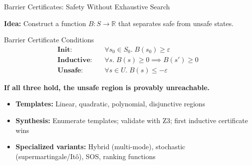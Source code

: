 \documentclass[aspectratio=169]{beamer}
\begin{document}
\begin{frame}{Barrier Certificates: Safety Without Exhaustive Search}

\textbf{Idea:} Construct a function $B : S \to \mathbb{R}$ that separates safe from unsafe states.

\begin{block}{Barrier Certificate Conditions}
\begin{align*}
  \textbf{Init:} \quad & \forall s_0 \in S_0.\; B(s_0) \geq \varepsilon \\
  \textbf{Inductive:} \quad & \forall s.\; B(s) \geq 0 \implies B(s') \geq 0 \\
  \textbf{Unsafe:} \quad & \forall s \in U.\; B(s) \leq -\varepsilon
\end{align*}
\end{block}

\textbf{If all three hold, the unsafe region is provably unreachable.}

\vspace{0.5em}
\begin{itemize}
  \item \textbf{Templates:} Linear, quadratic, polynomial, disjunctive regions
  \item \textbf{Synthesis:} Enumerate templates; validate with Z3; first inductive certificate wins
  \item \textbf{Specialized variants:} Hybrid (multi-mode), stochastic (supermartingale/It\^o), SOS, ranking functions
\end{itemize}

\end{frame}
\end{document}
